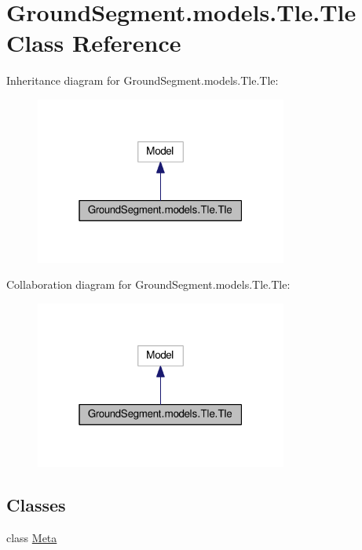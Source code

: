\hypertarget{class_ground_segment_1_1models_1_1_tle_1_1_tle}{}\section{Ground\+Segment.\+models.\+Tle.\+Tle Class Reference}
\label{class_ground_segment_1_1models_1_1_tle_1_1_tle}


Inheritance diagram for Ground\+Segment.\+models.\+Tle.\+Tle\+:\nopagebreak
\begin{figure}[H]
\begin{center}
\leavevmode
\includegraphics[width=235pt]{class_ground_segment_1_1models_1_1_tle_1_1_tle__inherit__graph}
\end{center}
\end{figure}


Collaboration diagram for Ground\+Segment.\+models.\+Tle.\+Tle\+:\nopagebreak
\begin{figure}[H]
\begin{center}
\leavevmode
\includegraphics[width=235pt]{class_ground_segment_1_1models_1_1_tle_1_1_tle__coll__graph}
\end{center}
\end{figure}
\subsection*{Classes}
\begin{DoxyCompactItemize}
\item 
class \hyperlink{class_ground_segment_1_1models_1_1_tle_1_1_tle_1_1_meta}{Meta}
\end{DoxyCompactItemize}
